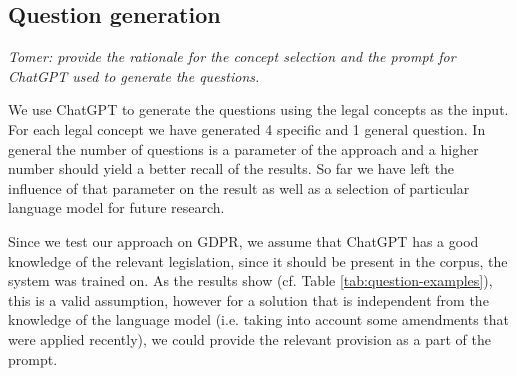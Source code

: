 \subsection{Question generation}

\textit{Tomer: provide the rationale for the concept selection and the prompt for ChatGPT used to generate the questions.}

We use ChatGPT to generate the questions using the legal concepts as the input. For each legal concept we have generated
4 specific and 1 general question. In general the number of questions is a parameter of the approach and a higher number
should yield a better recall of the results. So far we have left the influence of that parameter on the result as well
as a selection of particular language model for future research.

Since we test our approach on GDPR, we assume that ChatGPT has a good knowledge
of the relevant legislation, since it should be present in the corpus, the
system was trained on. As the results show (cf. Table
\ref{tab:question-examples}), this is a valid assumption, however for a solution
that is independent from the knowledge of the language model (i.e. taking into
account some amendments that were applied recently), we could provide the
relevant provision as a part of the prompt.

